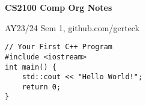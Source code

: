 \documentclass[12pt, landscape]{article}
\begin{document}
\raggedright
\footnotesize
\begin{multicols*}{3}



\setlength{\premulticols}{1pt}
\setlength{\postmulticols}{1pt}
\setlength{\multicolsep}{1pt}
\setlength{\columnsep}{2pt}

\begin{center}
     \Large{\textbf{CS2100 Comp Org Notes}} \\
\end{center}
AY23/24 Sem 1, github.com/gerteck
  
\begin{lstlisting}
// Your First C++ Program
#include <iostream>
int main() {
    std::cout << "Hello World!";
    return 0;
}
\end{lstlisting}
  
  
  
  
  
  
\end{multicols*}
\end{document}
